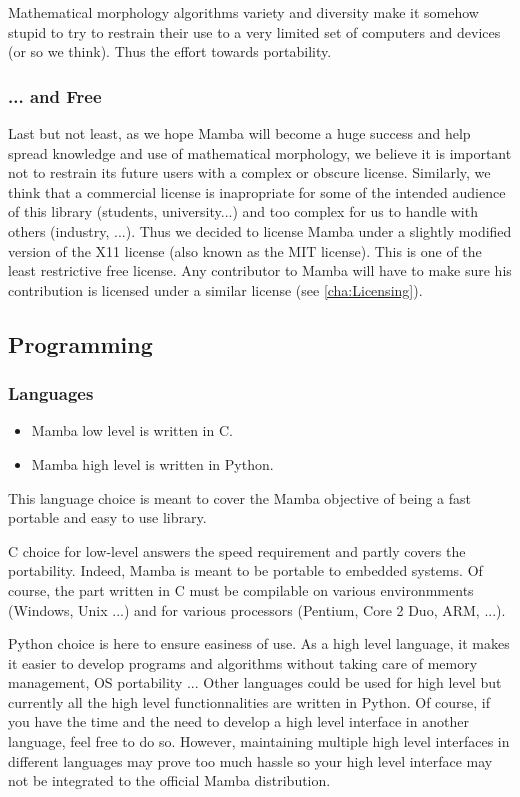 \documentclass[a4paper,10pt,oneside]{article}
\begin{document}
Mathematical morphology algorithms variety and diversity make it somehow
stupid to try to restrain their use to a very limited set of computers
and devices (or so we think). Thus the effort towards portability.


\subsubsection{... and Free}

Last but not least, as we hope Mamba will become a huge success and
help spread knowledge and use of mathematical morphology, we believe
it is important not to restrain its future users with a complex or
obscure license. Similarly, we think that a commercial license is inapropriate
for some of the intended audience of this library (students, university...)
and too complex for us to handle with others (industry, ...). Thus
we decided to license Mamba under a slightly modified version of the
X11 license (also known as the MIT license). This is one of the least
restrictive free license. Any contributor to Mamba will have to make
sure his contribution is licensed under a similar license (see \ref{cha:Licensing}).

\subsection{Programming}

\subsubsection{Languages}
\begin{itemize}
\item Mamba low level is written in C. 
\item Mamba high level is written in Python. 
\end{itemize}
This language choice is meant to cover the Mamba objective of being
a fast portable and easy to use library.

C choice for low-level answers the speed requirement and partly covers
the portability. Indeed, Mamba is meant to be portable to embedded
systems. Of course, the part written in C must be compilable on various
environmments (Windows, Unix ...) and for various processors (Pentium,
Core 2 Duo, ARM, ...).

Python choice is here to ensure easiness of use. As a high level language,
it makes it easier to develop programs and algorithms without taking
care of memory management, OS portability ... Other languages could
be used for high level but currently all the high level functionnalities
are written in Python. Of course, if you have the time and the need
to develop a high level interface in another language, feel free to
do so. However, maintaining multiple high level interfaces in different
languages may prove too much hassle so your high level interface may
not be integrated to the official Mamba distribution.
\end{document}
